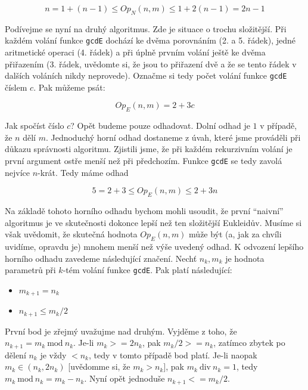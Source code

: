 \begin{displaymath}
 n = 1 + (n-1) \leq Op_N(n,m) \leq 1 + 2(n-1) = 2n - 1
\end{displaymath}


Podívejme se nyní na druhý algoritmus. Zde je situace o trochu složitější. Při každém volání funkce {\tt gcdE} dochází ke 
dvěma porovnáním (2. a 5. řádek), jedné aritmetické operaci (4. řádek) a při úplně prvním volání ještě ke dvěma přiřazením 
(3. řádek, uvědomte si, že jsou to přiřazení dvě a že se tento řádek v dalších
voláních nikdy neprovede). Označme si tedy počet volání funkce {\tt gcdE} číslem $c$. Pak můžeme psát:

\begin{displaymath}
Op_E(n,m) = 2 + 3c
\end{displaymath}

Jak spočíst číslo $c$? Opět budeme pouze odhadovat. Dolní odhad je $1$ v případě, že $n$ dělí $m$. Jednoduchý horní odhad dostaneme
z úvah, které jsme prováděli při důkazu správnosti algoritmu. Zjistili jsme, že při každém rekurzivním volání je první argument ostře 
menší než při předchozím. Funkce {\tt gcdE} se tedy zavolá nejvíce $n$-krát. Tedy máme odhad

\begin{displaymath}
 5 = 2+3\leq Op_E(n,m) \leq 2 + 3n
\end{displaymath}

Na základě tohoto horního odhadu bychom mohli usoudit, že první ``naivní'' algoritmus je ve skutečnosti dokonce lepší než ten složitější
Eukleidův. Musíme si však uvědomit, že skutečná hodnota $Op_E(n,m)$ může být (a, jak za chvíli
uvidíme, opravdu je) mnohem menší než výše uvedený odhad. K odvození lepšího horního odhadu zavedeme následující značení. Nechť
$n_k,m_k$ je hodnota parametrů při $k$-tém volání funkce {\tt gcdE}. Pak platí následující:

\begin{itemize}
 \item $m_{k+1}=n_k$
 \item $n_{k+1}\leq m_k/2$
\end{itemize}

První bod je zřejmý uvažujme nad druhým. Vyjděme z toho, že $n_{k+1} = m_k\ \mbox{mod}\ n_k$. Je-li $m_k>=2n_k$, pak $m_k/2>=n_k$, zatímco
zbytek po dělení $n_k$ je vždy $< n_k$, tedy v tomto případě bod platí. Je-li naopak $m_k \in (n_k, 2n_k)$ [uvědomme si, že $m_k > n_k]$, pak 
$m_k\ \mbox{div}\ n_k = 1$, tedy $m_k\ \mbox{mod}\ n_k = m_k-n_k$. Nyní opět jednoduše $n_{k+1} <= m_k/2$. 

